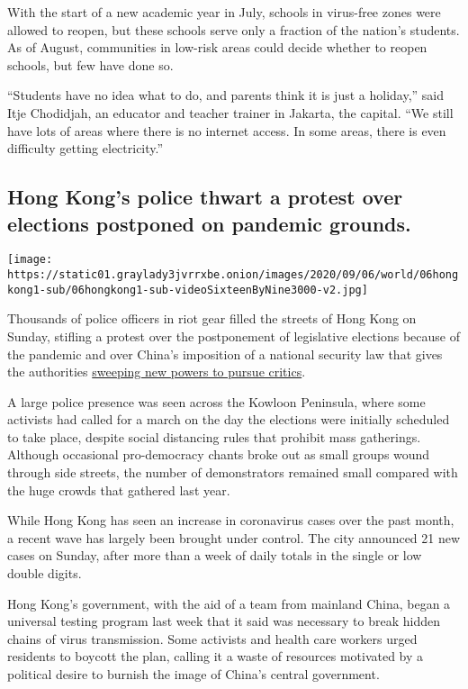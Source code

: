 With the start of a new academic year in July, schools in virus-free
zones were allowed to reopen, but these schools serve only a fraction of
the nation's students. As of August, communities in low-risk areas could
decide whether to reopen schools, but few have done so.

``Students have no idea what to do, and parents think it is just a
holiday,'' said Itje Chodidjah, an educator and teacher trainer in
Jakarta, the capital. ``We still have lots of areas where there is no
internet access. In some areas, there is even difficulty getting
electricity.''

\hypertarget{hong-kongs-police-thwart-a-protest-over-elections-postponed-on-pandemic-grounds}{%
\subsection{Hong Kong's police thwart a protest over elections postponed
on pandemic
grounds.}\label{hong-kongs-police-thwart-a-protest-over-elections-postponed-on-pandemic-grounds}}

\texttt{[image: https://static01.graylady3jvrrxbe.onion/images/2020/09/06/world/06hongkong1-sub/06hongkong1-sub-videoSixteenByNine3000-v2.jpg]}

Thousands of police officers in riot gear filled the streets of Hong
Kong on Sunday, stifling a protest over the postponement of legislative
elections because of the pandemic and over China's imposition of a
national security law that gives the authorities
\href{https://www.nytimes3xbfgragh.onion/interactive/2020/09/04/world/asia/hong-kong-speech.html}{sweeping
new powers to pursue critics}.

A large police presence was seen across the Kowloon Peninsula, where
some activists had called for a march on the day the elections were
initially scheduled to take place, despite social distancing rules that
prohibit mass gatherings. Although occasional pro-democracy chants broke
out as small groups wound through side streets, the number of
demonstrators remained small compared with the huge crowds that gathered
last year.

While Hong Kong has seen an increase in coronavirus cases over the past
month, a recent wave has largely been brought under control. The city
announced 21 new cases on Sunday, after more than a week of daily totals
in the single or low double digits.

Hong Kong's government, with the aid of a team from mainland China,
began a universal testing program last week that it said was necessary
to break hidden chains of virus transmission. Some activists and health
care workers urged residents to boycott the plan, calling it a waste of
resources motivated by a political desire to burnish the image of
China's central government.

